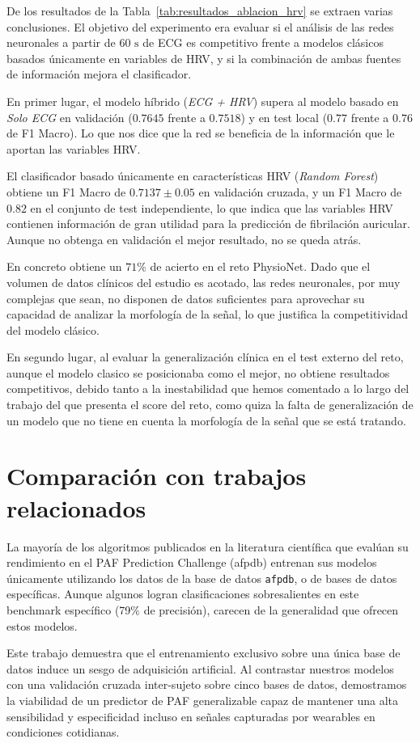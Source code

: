 De los resultados de la Tabla~\ref{tab:resultados_ablacion_hrv} se extraen varias conclusiones.
El objetivo del experimento era evaluar si el análisis de las redes neuronales a partir
de $60\text{ s}$ de ECG es competitivo frente a modelos clásicos basados únicamente en variables de
HRV, y si la combinación de ambas fuentes de
información mejora el clasificador.

En primer lugar, el modelo híbrido (\textit{ECG + HRV}) supera al
modelo basado en \textit{Solo ECG} en validación ($0.7645$ frente a $0.7518$) y en test local ($0.77$ frente a $0.76$ de F1 Macro).
Lo que nos dice que la red se beneficia de la información que le aportan las variables HRV.

El clasificador basado únicamente en características HRV (\textit{Random Forest}) obtiene un F1 Macro de $0.7137 \pm 0.05$
en validación cruzada, y un F1 Macro de $0.82$ en el conjunto de test independiente, lo que indica que las variables HRV contienen
información de gran utilidad para la predicción de fibrilación auricular. Aunque no obtenga en validación el mejor resultado, no
se queda atrás.

En concreto obtiene un $71\%$ de acierto en el reto PhysioNet. Dado que el volumen de datos clínicos
del estudio es acotado, las redes neuronales, por muy complejas que sean, no disponen de datos suficientes
para aprovechar su capacidad de analizar la morfología de la señal, lo que justifica la competitividad del
modelo clásico.


En segundo lugar, al evaluar la generalización clínica en el test externo del reto, aunque el modelo clasico
se posicionaba como el mejor, no obtiene resultados competitivos, debido tanto a la inestabilidad que hemos
comentado a lo largo del trabajo del que presenta el score del reto, como quiza la falta de generalización
de un modelo que no tiene en cuenta la morfología de la señal que se está tratando.


\section{Comparación con trabajos relacionados}
\label{sec:comparacion_trabajos}

La mayoría de los algoritmos publicados en la literatura científica que evalúan su rendimiento en el
PAF Prediction Challenge (afpdb\cite{moody_paf_2001}) entrenan sus modelos únicamente utilizando
los datos de la base de datos \texttt{afpdb}, o de bases de datos específicas.
Aunque algunos logran clasificaciones sobresalientes en este benchmark específico (79\% de precisión),
carecen de la generalidad que ofrecen estos modelos.

Este trabajo demuestra que el entrenamiento exclusivo sobre una única base de datos induce un sesgo de
adquisición artificial. Al contrastar nuestros modelos con una validación cruzada inter-sujeto
sobre cinco bases de datos, demostramos la viabilidad de un predictor de PAF generalizable capaz de
mantener una alta sensibilidad y especificidad incluso en señales capturadas por wearables en
condiciones cotidianas.
